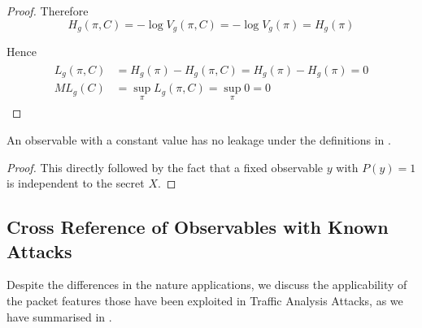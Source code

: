 \begin{proof}
	Therefore
	\begin{equation*}
		H_g(\pi, C) = -\log{V_g(\pi, C)} = -\log{V_g(\pi)} = H_g(\pi)
	\end{equation*}
	
	Hence 
	\begin{eqnarray*}
		\begin{aligned}
			L_g(\pi, C) &= H_g(\pi) - H_g(\pi,C) = H_g(\pi) - H_g(\pi) = 0\\
			ML_g(C) &= \sup_{\pi} L_g(\pi, C) = \sup_{\pi} 0 = 0
		\end{aligned}
	\end{eqnarray*}
\end{proof}

\begin{corollary} \label{Cor: Constant Leakage}
	An observable with a constant value has no leakage under the definitions in .
\end{corollary}

\begin{proof}
	This directly followed by the fact that a fixed observable $y$ with $P(y) = 1$ is independent to the secret $X$.
\end{proof}

\subsection{Cross Reference of Observables with Known Attacks} \label{Subsec: Cross Reference}

Despite the differences in the nature applications, we discuss the applicability of the packet features those have been exploited in Traffic Analysis Attacks, as we have summarised in .

